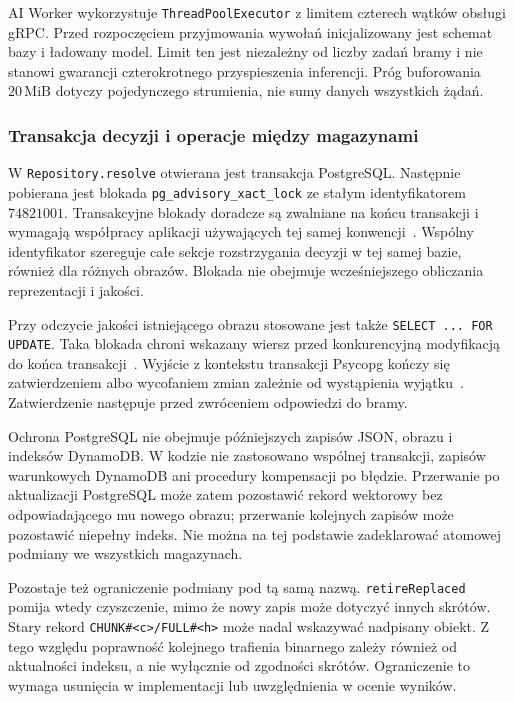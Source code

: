 AI Worker wykorzystuje \texttt{ThreadPoolExecutor} z limitem
czterech wątków obsługi gRPC.
Przed rozpoczęciem przyjmowania wywołań inicjalizowany jest schemat
bazy i ładowany model.
Limit ten jest niezależny od liczby zadań bramy i nie stanowi
gwarancji czterokrotnego przyspieszenia inferencji.
Próg buforowania \(20\,\mathrm{MiB}\) dotyczy pojedynczego
strumienia, nie sumy danych wszystkich żądań.

\subsubsection{Transakcja decyzji i operacje między magazynami}

W \texttt{Repository.resolve} otwierana jest transakcja PostgreSQL.
Następnie pobierana jest blokada
\texttt{pg\_\allowbreak advisory\_\allowbreak xact\_\allowbreak lock}
ze stałym identyfikatorem \(74821001\).
Transakcyjne blokady doradcze są zwalniane na końcu transakcji
i wymagają współpracy aplikacji używających tej samej
konwencji~\cite{postgres16_locking}.
Wspólny identyfikator szereguje całe sekcje rozstrzygania decyzji
w tej samej bazie, również dla różnych obrazów.
Blokada nie obejmuje wcześniejszego obliczania reprezentacji
i jakości.

Przy odczycie jakości istniejącego obrazu stosowane jest także
\texttt{SELECT ... FOR UPDATE}.
Taka blokada chroni wskazany wiersz przed konkurencyjną modyfikacją
do końca transakcji~\cite{postgres16_locking}.
Wyjście z kontekstu transakcji Psycopg kończy się zatwierdzeniem
albo wycofaniem zmian zależnie od wystąpienia
wyjątku~\cite{psycopg_transactions}.
Zatwierdzenie następuje przed zwróceniem odpowiedzi do bramy.

Ochrona PostgreSQL nie obejmuje późniejszych zapisów JSON, obrazu
i indeksów DynamoDB. W kodzie nie zastosowano wspólnej transakcji,
zapisów warunkowych DynamoDB ani procedury kompensacji po błędzie.
Przerwanie po aktualizacji PostgreSQL może zatem pozostawić
rekord wektorowy bez odpowiadającego mu nowego obrazu;
przerwanie kolejnych zapisów może pozostawić niepełny indeks.
Nie można na tej podstawie zadeklarować atomowej podmiany
we wszystkich magazynach.

Pozostaje też ograniczenie podmiany pod tą samą nazwą.
\texttt{retireReplaced} pomija wtedy czyszczenie, mimo że nowy zapis
może dotyczyć innych skrótów. Stary rekord
\texttt{CHUNK\#<c>/\allowbreak FULL\#<h>} może nadal wskazywać nadpisany obiekt.
Z tego względu poprawność kolejnego trafienia binarnego zależy
również od aktualności indeksu, a nie wyłącznie od zgodności
skrótów. Ograniczenie to wymaga usunięcia w implementacji
lub uwzględnienia w ocenie wyników.

